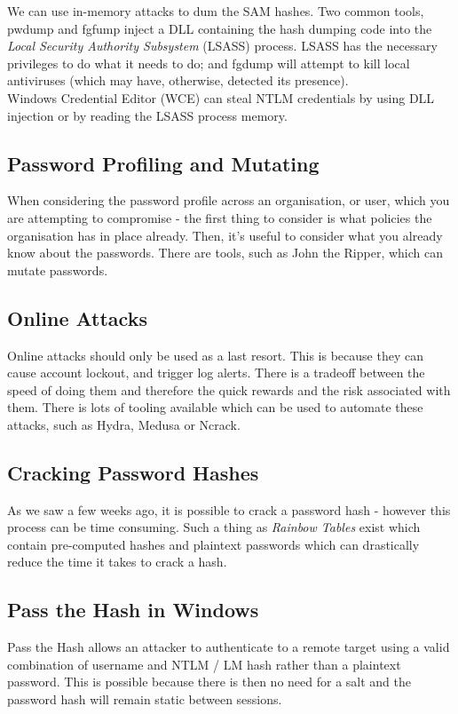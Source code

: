 We can use in-memory attacks to dum the SAM hashes. Two common tools, pwdump and fgfump inject a DLL containing the hash dumping code into the \textit{Local Security Authority Subsystem} (LSASS) process. LSASS has the necessary privileges to do what it needs to do; and fgdump will attempt to kill local antiviruses (which may have, otherwise, detected its presence).\\

Windows Credential Editor (WCE) can steal NTLM credentials by using DLL injection or by reading the LSASS process memory.

\subsection{Password Profiling and Mutating}
When considering the password profile across an organisation, or user, which you are attempting to compromise - the first thing to consider is what policies the organisation has in place already. Then, it's useful to consider what you already know about the passwords. There are tools, such as John the Ripper, which can mutate passwords.

\subsection{Online Attacks}
Online attacks should only be used as a last resort. This is because they can cause account lockout, and trigger log alerts. There is a tradeoff between the speed of doing them and therefore the quick rewards and the risk associated with them. There is lots of tooling available which can be used to automate these attacks, such as Hydra, Medusa or Ncrack.

\subsection{Cracking Password Hashes}
As we saw a few weeks ago, it is possible to crack a password hash - however this process can be time consuming. Such a thing as \textit{Rainbow Tables} exist which contain pre-computed hashes and plaintext passwords which can drastically reduce the time it takes to crack a hash. 

\subsection{Pass the Hash in Windows}
Pass the Hash allows an attacker to authenticate to a remote target using a valid combination of username and NTLM / LM hash rather than a plaintext password. This is possible because there is then no need for a salt and the password hash will remain static between sessions. 

